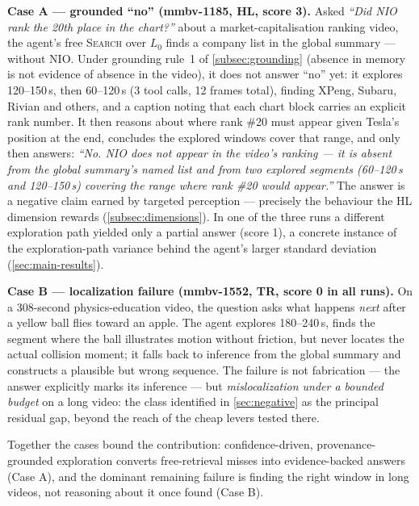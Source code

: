 \textbf{Case A --- grounded ``no'' (mmbv-1185, HL, score 3).} Asked \emph{``Did
NIO rank the 20th place in the chart?''} about a market-capitalisation ranking
video, the agent's free \textsc{Search} over $L_0$ finds a company list in the
global summary --- without NIO. Under grounding rule~1 of \cref{subsec:grounding}
(absence in memory is not evidence of absence in the video), it does not answer
``no'' yet: it explores 120--150\,s, then 60--120\,s (3 tool calls, 12 frames
total), finding XPeng, Subaru, Rivian and others, and a caption noting that each
chart block carries an explicit rank number. It then reasons about where rank \#20
must appear given Tesla's position at the end, concludes the explored windows cover
that range, and only then answers: \emph{``No. NIO does not appear in the video's
ranking --- it is absent from the global summary's named list and from two
explored segments (60--120\,s and 120--150\,s) covering the range where rank \#20
would appear.''} The answer is a negative claim earned by targeted perception ---
precisely the behaviour the HL dimension rewards (\cref{subsec:dimensions}). In
one of the three runs a different exploration path yielded only a partial answer
(score 1), a concrete instance of the exploration-path variance behind the agent's
larger standard deviation (\cref{sec:main-results}).

\textbf{Case B --- localization failure (mmbv-1552, TR, score 0 in all runs).} On
a 308-second physics-education video, the question asks what happens \emph{next}
after a yellow ball flies toward an apple. The agent explores 180--240\,s, finds
the segment where the ball illustrates motion without friction, but never locates
the actual collision moment; it falls back to inference from the global summary
and constructs a plausible but wrong sequence. The failure is not fabrication ---
the answer explicitly marks its inference --- but \emph{mislocalization under a
bounded budget} on a long video: the class identified in \cref{sec:negative} as
the principal residual gap, beyond the reach of the cheap levers tested there.

Together the cases bound the contribution: confidence-driven, provenance-grounded
exploration converts free-retrieval misses into evidence-backed answers
(Case A), and the dominant remaining failure is finding the right window in long
videos, not reasoning about it once found (Case B).
